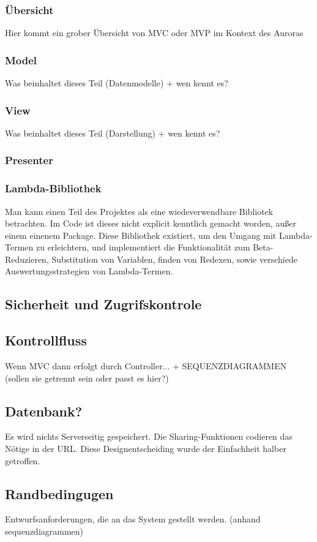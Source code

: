 \documentclass[parskip=full,11pt,twoside]{scrartcl}
\begin{document}
\subsubsection{Übersicht}
Hier kommt ein grober Übersicht von MVC oder MVP im Kontext des Auroras
\subsubsection{Model}
Was beinhaltet dieses Teil (Datenmodelle) + wen kennt es?
\subsubsection{View}
Was beinhaltet dieses Teil (Darstellung) + wen kennt es?
\subsubsection{Presenter}

\subsubsection{Lambda-Bibliothek}
Man kann einen Teil des Projektes als eine wiedeverwendbare Bibliotek betrachten. Im Code ist dieses nicht
explicit kenntlich gemacht worden, außer einem einenem Package.
Diese Bibliothek existiert, um den Umgang mit Lambda-Termen zu erleichtern, und implementiert die
Funktionalität zum Beta-Reduzieren, Substitution von Variablen, finden von Redexen, sowie verschiede Auswertungsstrategien von Lambda-Termen.


\subsection{Sicherheit und Zugrifskontrole}
\subsection{Kontrollfluss}
Wenn MVC dann erfolgt durch Controller...  + SEQUENZDIAGRAMMEN (sollen sie getrennt sein oder passt es hier?)
\subsection{Datenbank?}
Es wird nichts Serverseitig gespeichert. Die Sharing-Funktionen codieren das Nötige in der URL.
Diese Designentscheiding wurde der Einfachheit halber getroffen.
\subsection{Randbedingugen}
Entwurfsanforderungen, die an das System gestellt werden. (anhand sequenzdiagrammen)
\pagebreak
\end{document}
